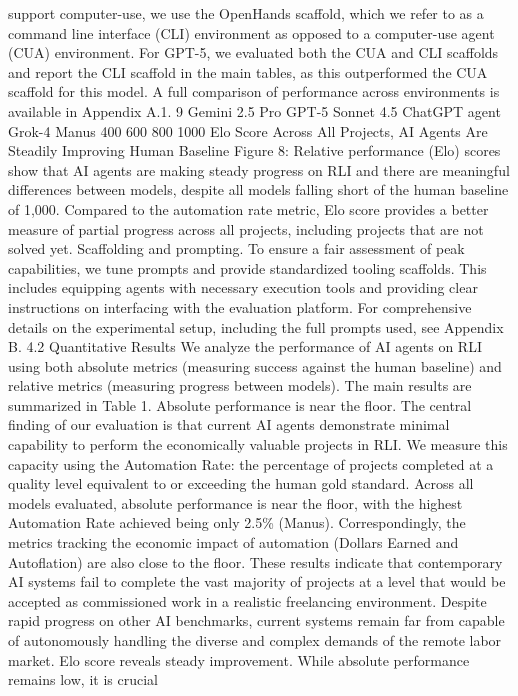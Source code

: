 support computer-use, we use the OpenHands scaffold, which we refer to as a command line interface
(CLI) environment as opposed to a computer-use agent (CUA) environment. For GPT-5, we evaluated
both the CUA and CLI scaffolds and report the CLI scaffold in the main tables, as this outperformed
the CUA scaffold for this model. A full comparison of performance across environments is available
in Appendix A.1.
9
Gemini
2.5 Pro
GPT-5
Sonnet 4.5
ChatGPT
agent
Grok-4
Manus
400
600
800
1000
Elo Score
Across All Projects, AI Agents Are Steadily Improving
Human Baseline
Figure 8: Relative performance (Elo) scores show that AI agents are making steady progress on RLI
and there are meaningful differences between models, despite all models falling short of the human
baseline of 1,000. Compared to the automation rate metric, Elo score provides a better measure of
partial progress across all projects, including projects that are not solved yet.
Scaffolding and prompting.
To ensure a fair assessment of peak capabilities, we tune prompts
and provide standardized tooling scaffolds. This includes equipping agents with necessary execution
tools and providing clear instructions on interfacing with the evaluation platform. For comprehensive
details on the experimental setup, including the full prompts used, see Appendix B.
4.2
Quantitative Results
We analyze the performance of AI agents on RLI using both absolute metrics (measuring success
against the human baseline) and relative metrics (measuring progress between models). The main
results are summarized in Table 1.
Absolute performance is near the floor.
The central finding of our evaluation is that current AI
agents demonstrate minimal capability to perform the economically valuable projects in RLI. We
measure this capacity using the Automation Rate: the percentage of projects completed at a quality
level equivalent to or exceeding the human gold standard. Across all models evaluated, absolute
performance is near the floor, with the highest Automation Rate achieved being only 2.5\% (Manus).
Correspondingly, the metrics tracking the economic impact of automation (Dollars Earned and
Autoflation) are also close to the floor. These results indicate that contemporary AI systems fail to
complete the vast majority of projects at a level that would be accepted as commissioned work in a
realistic freelancing environment. Despite rapid progress on other AI benchmarks, current systems
remain far from capable of autonomously handling the diverse and complex demands of the remote
labor market.
Elo score reveals steady improvement.
While absolute performance remains low, it is crucial
